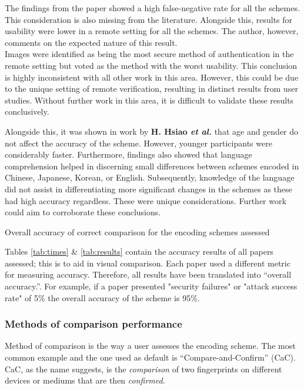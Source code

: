 The findings from the paper showed a high false-negative rate for all the schemes. This consideration is also missing from the literature. Alongside this, results for usability were lower in a remote setting for all the schemes. The author, however, comments on the expected nature of this result.\\
Images were identified as being the most secure method of authentication in the remote setting but voted as the method with the worst usability. This conclusion is highly inconsistent with all other work in this area. However, this could be due to the unique setting of remote verification, resulting in distinct results from user studies. Without further work in this area, it is difficult to validate these results conclusively.

Alongside this, it was shown in work by \textbf{H. Hsiao \textit{et al.}}\cite{hsiao2009study} that age and gender do not affect the accuracy of the scheme. However, younger participants were considerably faster. Furthermore, findings also showed that language comprehension helped in discerning small differences between schemes encoded in Chinese, Japanese, Korean, or English. Subsequently, knowledge of the language did not assist in differentiating more significant changes in the schemes as these had high accuracy regardless. These were unique considerations. Further work could aim to corroborate these conclusions.

\begin{table}[h!]
    \makebox[\textwidth][c]{
        
    }%
    \caption{Overall accuracy of correct comparison for the encoding schemes assessed}
    \label{tab:results}
\end{table}

Tables \ref{tab:times} \& \ref{tab:results} contain the accuracy results of all papers assessed; this is to aid in visual comparison. Each paper used a different metric for measuring accuracy. Therefore, all results have been translated into ``overall accuracy.''. For example, if a paper presented "security failures" or "attack success rate" of 5\% the overall accuracy of the scheme is 95\%.

\subsubsection*{Methods of comparison performance}

Method of comparison is the way a user assesses the encoding scheme. The most common example and the one used as default is ``Compare-and-Confirm'' (CaC). CaC, as the name suggests, is the \textit{comparison} of two fingerprints on different devices or mediums that are then \textit{confirmed}. 

